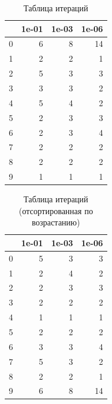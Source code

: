 \documentclass[a4paper]{article}
\begin{document}
\begin{table}[h]
\centering
\caption{Таблица итераций}
\label{table_iters}
\begin{tabular}{|l|r|r|r|}
\hline
{} &  1e-01 &  1e-03 &  1e-06 \\
\hline
0 &      6 &      8 &     14 \\
\hline
1 &      2 &      2 &      1 \\
\hline
2 &      5 &      3 &      3 \\
\hline
3 &      3 &      3 &      2 \\
\hline
4 &      5 &      4 &      2 \\
\hline
5 &      2 &      3 &      3 \\
\hline
6 &      2 &      3 &      4 \\
\hline
7 &      2 &      2 &      2 \\
\hline
8 &      2 &      2 &      2 \\
\hline
9 &      1 &      1 &      1 \\
\hline
\end{tabular}
\end{table}

\begin{table}[h]
\centering
\caption{Таблица итераций (отсортированная по возрастанию)}
\label{table_iters_sorted}
\begin{tabular}{|l|r|r|r|}
\hline
{} &  1e-01 &  1e-03 &  1e-06 \\
\hline
0 &      5 &      3 &      3 \\
\hline
1 &      2 &      4 &      2 \\
\hline
2 &      2 &      3 &      3 \\
\hline
3 &      2 &      2 &      2 \\
\hline
4 &      1 &      1 &      1 \\
\hline
5 &      2 &      2 &      2 \\
\hline
6 &      3 &      3 &      4 \\
\hline
7 &      5 &      3 &      2 \\
\hline
8 &      2 &      2 &      1 \\
\hline
9 &      6 &      8 &     14 \\
\hline
\end{tabular}
\end{table}

\newpage
\end{document}
